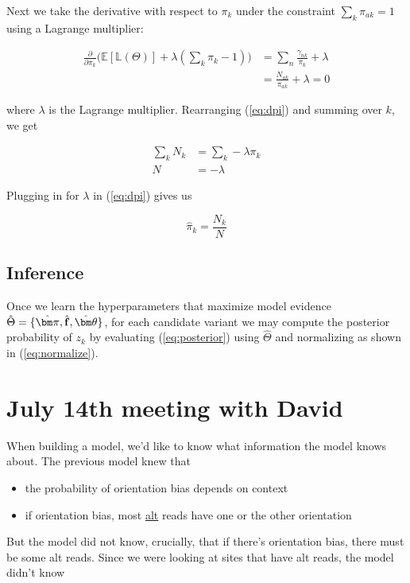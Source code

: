 \documentclass[a4paper]{article}
\newcommand{\vf}{{\bf f}}
\newcommand{\vpi}{{\bm \pi}}
\newcommand{\vtheta}{{\bm \theta}}
\newcommand{\E}{\mathbb{E}}
\newcommand{\LL}{\mathbb{L}}
\begin{document}
Next we take the derivative with respect to $\pi_{k}$ under the constraint $\sum_k \pi_{ak} = 1$ using a Lagrange multiplier:

\begin{align}
\frac{\partial}{\partial \pi_{k}} \Big( \E [ \LL (\Theta) ] + \lambda ( \sum_k \pi_{k} - 1) \Big) &= \sum_{n} \frac{\gamma_{nk}}{\pi_{k}} + \lambda \nonumber \\
																   &= \frac{N_{ak}}{\pi_{ak}} + \lambda = 0 \label{eq:dpi}
\end{align}

where $\lambda$ is the Lagrange multiplier. Rearranging (\ref{eq:dpi}) and summing over $k$, we get

\begin{align*}
\sum_k N_{k} &= \sum_k - \lambda \pi_{k} \\
      N &= - \lambda
\end{align*}

Plugging in for $\lambda$ in (\ref{eq:dpi}) gives us

\begin{equation}
\hat{\pi}_{k} = \frac{N_{k}}{N}
\end{equation}

\subsection{Inference}
Once we learn the hyperparameters that maximize model evidence $\hat{\Theta} = \{ \hat{\vpi}, \hat{\vf}, \hat{\vtheta} \}$, for each candidate variant we may compute the posterior probability of $z_k$ by evaluating (\ref{eq:posterior}) using $\hat{\Theta}$ and normalizing as shown in (\ref{eq:normalize}). 


\section{July 14th meeting with David}

When building a model, we'd like to know what information the model knows about. The previous model knew that 

\begin{itemize}
\item the probability of orientation bias depends on context
\item if orientation bias, most \underline{alt} reads have one or the other orientation
\end{itemize}

But the model did not know, crucially, that if there's orientation bias, there must be some alt reads. Since we were looking at sites that have alt reads, the model didn't know 
\end{document}
